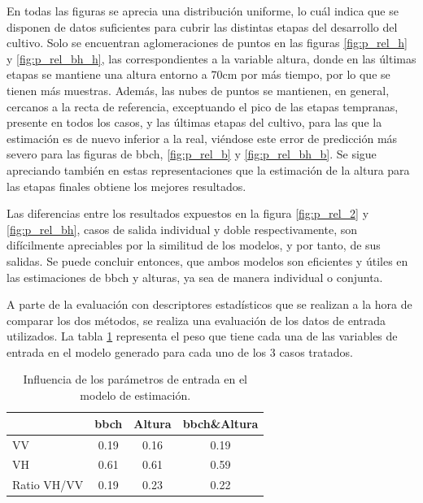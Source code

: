 \par En todas las figuras se aprecia una distribución uniforme, lo cuál indica que se disponen de datos suficientes para cubrir las distintas etapas del desarrollo del cultivo. Solo se encuentran aglomeraciones de puntos en las figuras \ref{fig:p_rel_h} y \ref{fig:p_rel_bh_h}, las correspondientes a la variable altura, donde en las últimas etapas se mantiene una altura entorno a 70cm por más tiempo, por lo que se tienen más muestras. Además, las nubes de puntos se mantienen, en general, cercanos a la recta de referencia, exceptuando el pico de las etapas tempranas, presente en todos los casos, y las últimas etapas del cultivo, para las que la estimación es de nuevo inferior a la real, viéndose este error de predicción más severo para las figuras de \gls{bbch}, \ref{fig:p_rel_b} y \ref{fig:p_rel_bh_b}. Se sigue apreciando también en estas representaciones que la estimación de la altura para las etapas finales obtiene los mejores resultados. 
\\
\par Las diferencias entre los resultados expuestos en la figura \ref{fig:p_rel_2} y \ref{fig:p_rel_bh}, casos de salida individual y doble respectivamente, son difícilmente apreciables por la similitud de los modelos, y por tanto, de sus salidas. Se puede concluir entonces, que ambos modelos son eficientes y útiles en las estimaciones de \gls{bbch} y alturas, ya sea de manera individual o conjunta. 
\\ 
\par A parte de la evaluación con descriptores estadísticos que se realizan a la hora de comparar los dos métodos, se realiza una evaluación de los datos de entrada utilizados. La tabla \ref{tab:p_imp_f} representa el peso que tiene cada una de las variables de entrada en el modelo generado para cada uno de los 3 casos tratados. 

\begin{table}[h]
\centering
\begin{tabular}{l|ccc}
               & \gls{bbch} & Altura & \gls{bbch}\&Altura \\ \hline \hline
VV             & 0.19 & 0.16   & 0.19         \\
VH             & 0.61 & 0.61   & 0.59         \\
Ratio VH/VV    & 0.19 & 0.23   & 0.22         
     
\end{tabular}
\caption{Influencia de los parámetros de entrada en el modelo de estimación. \label{tab:p_imp_f}}
\end{table}

